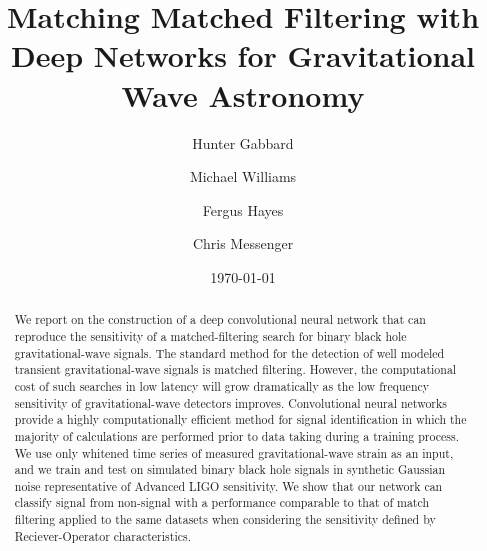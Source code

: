\documentclass[%
showpacs,
 amsmath,amssymb,
 aps,
 twocolumn,
 prl,
 reprint,
floatfix,
]{revtex4-1}
\newcommand{\dcc}{LIGO-P1700378}
\begin{document}

%
%
\title{Matching Matched Filtering with Deep Networks for Gravitational Wave Astronomy}

\author{Hunter Gabbard}
\author{Michael Williams}
\author{Fergus Hayes}
\author{Chris Messenger}

\date{\today}%


%
%
\begin{abstract} 
%
We report on the construction of a deep convolutional neural network that can
reproduce the sensitivity of a matched-filtering search for binary black hole
gravitational-wave signals. The standard method for the detection of well
modeled transient gravitational-wave signals is matched filtering. However, the
computational cost of such searches in low latency will grow dramatically as
the low frequency sensitivity of gravitational-wave detectors improves.
Convolutional neural networks provide a highly computationally efficient method
for signal identification in which the majority of calculations are performed
prior to data taking during a training process. We use only whitened time
series of measured gravitational-wave strain as an input, and we train and test
on simulated binary black hole signals in synthetic Gaussian noise
representative of Advanced LIGO sensitivity.  We show that our network can
classify signal from non-signal with a performance {\color{red}comparable to
that of match filtering} applied to the same datasets when considering the
sensitivity defined by Reciever-Operator characteristics.
%
\end{abstract}



\end{document}
